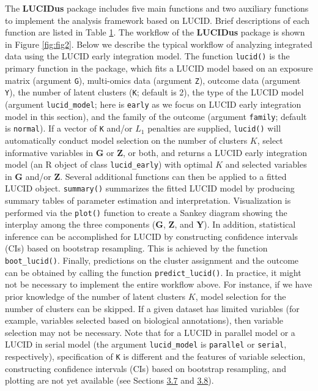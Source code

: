 The \textbf{LUCIDus} package includes five main functions and two auxiliary
functions to implement the analysis framework based on LUCID. Brief
descriptions of each function are listed in Table \hyperref[tbl1]{1}. The
workflow of the \textbf{LUCIDus} package is shown in Figure \ref{fig:fig2}.
Below we describe the typical workflow of analyzing integrated data
using the LUCID early integration model. The function \texttt{lucid()} is the
primary function in the package, which fits a LUCID model based on an
exposure matrix (argument \texttt{G}), multi-omics data (argument \texttt{Z}), outcome
data (argument \texttt{Y}), the number of latent clusters (\texttt{K}; default is 2),
the type of the LUCID model (argument \texttt{lucid\textasciigrave{}\textasciigrave{}\_\textasciigrave{}\textasciigrave{}model}; here is \texttt{early}
as we focus on LUCID early integration model in this section), and the
family of the outcome (argument \texttt{family}; default is \texttt{normal}). If a
vector of \texttt{K} and/or \(L_1\) penalties are supplied, \texttt{lucid()} will
automatically conduct model selection on the number of clusters \(K\),
select informative variables in \(\boldsymbol{\mathbf{G}}\) or
\(\boldsymbol{\mathbf{Z}}\), or both, and returns a LUCID early
integration model (an R object of class \texttt{lucid\_early}) with optimal \(K\)
and selected variables in \(\boldsymbol{\mathbf{G}}\) and/or
\(\boldsymbol{\mathbf{Z}}\). Several additional functions can then be
applied to a fitted LUCID object. \texttt{summary()} summarizes the fitted
LUCID model by producing summary tables of parameter estimation and
interpretation. Visualization is performed via the \texttt{plot()} function to
create a Sankey diagram showing the interplay among the three components
(\(\boldsymbol{\mathbf{G}}\), \(\boldsymbol{\mathbf{Z}}\), and
\(\boldsymbol{\mathbf{Y}}\)). In addition, statistical inference can be
accomplished for LUCID by constructing confidence intervals (CIs) based
on bootstrap resampling. This is achieved by the function
\texttt{boot\_lucid()}. Finally, predictions on the cluster assignment and the
outcome can be obtained by calling the function \texttt{predict\_lucid()}. In
practice, it might not be necessary to implement the entire workflow
above. For instance, if we have prior knowledge of the number of latent
clusters \(K\), model selection for the number of clusters can be skipped.
If a given dataset has limited variables (for example, variables
selected based on biological annotations), then variable selection may
not be necessary. Note that for a LUCID in parallel model or a LUCID in
serial model (the argument \texttt{lucid\_model} is \texttt{parallel} or \texttt{serial},
respectively), specification of \texttt{K} is different and the features of
variable selection, constructing confidence intervals (CIs) based on
bootstrap resampling, and plotting are not yet available (see Sections
\hyperref[sec_parallel]{3.7} and \hyperref[sec_serial]{3.8}).

